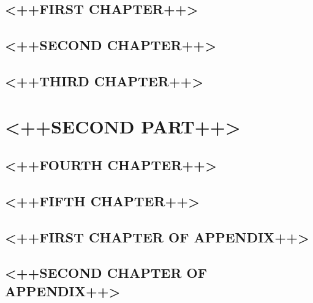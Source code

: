 \documentclass[10pt]{book}
\begin{document}
\chapter{<++FIRST CHAPTER++>}
\chapter{<++SECOND CHAPTER++>}
\chapter{<++THIRD CHAPTER++>}

\part{<++SECOND PART++>}
\chapter{<++FOURTH CHAPTER++>}
\chapter{<++FIFTH CHAPTER++>}

\appendix
\chapter{<++FIRST CHAPTER OF APPENDIX++>}
\chapter{<++SECOND CHAPTER OF APPENDIX++>}

\backmatter
\tocbibliography
\end{document}
